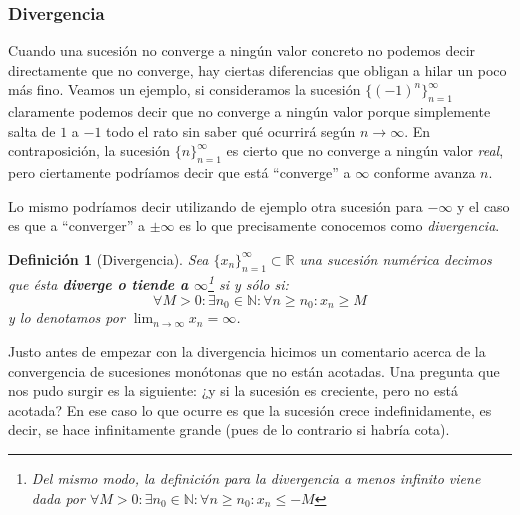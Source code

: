 \documentclass[10pt,a4paper,openright]{book}
\theoremstyle{break}
\newtheorem{defi}{Definición}[chapter]
\begin{document}
\subsubsection{Divergencia}
Cuando una sucesión no converge a ningún valor concreto no podemos decir directamente que no converge, hay ciertas diferencias que obligan a hilar un poco más fino. Veamos un ejemplo, si consideramos la sucesión $\{(-1)^n\}_{n=1}^\infty$ claramente podemos decir que no converge a ningún valor porque simplemente salta de $1$ a $-1$ todo el rato sin saber qué ocurrirá según $n\rightarrow \infty$. En contraposición, la sucesión $\{n\}_{n=1}^\infty$ es cierto que no converge a ningún valor \textit{real}, pero ciertamente podríamos decir que está ``converge'' a $\infty$ conforme avanza $n$.

Lo mismo podríamos decir utilizando de ejemplo otra sucesión para $-\infty$ y el caso es que a ``converger'' a $\pm\infty$ es lo que precisamente conocemos como \textit{divergencia}.

\begin{defi}[Divergencia]
Sea $\{x_n\}_{n=1}^\infty\subset \mathbb R$ una sucesión numérica decimos que ésta \textbf{diverge o tiende a $\infty$}\footnote{Del mismo modo, la definición para la divergencia a menos infinito viene dada por $\forall M>0: \exists n_0\in \mathbb N: \forall n \geq n_0: x_n\leq -M$} si y sólo si:
\[
\forall M>0: \exists n_0\in \mathbb N: \forall n \geq n_0: x_n\geq M
\]
y lo denotamos por $\lim_{n\rightarrow\infty} x_n = \infty$.
\end{defi}

Justo antes de empezar con la divergencia hicimos un comentario acerca de la convergencia de sucesiones monótonas que no están acotadas. Una pregunta que nos pudo surgir es la siguiente: ¿y si la sucesión es creciente, pero no está acotada? En ese caso lo que ocurre es que la sucesión crece indefinidamente, es decir, se hace infinitamente grande (pues de lo contrario si habría cota).
\end{document}
